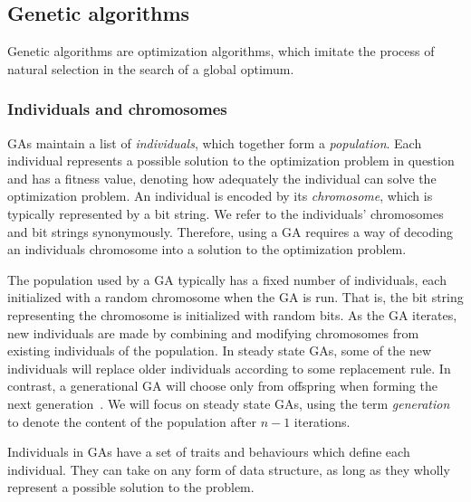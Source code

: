 \subsection{Genetic algorithms} 
Genetic algorithms are optimization algorithms, which imitate the process of natural selection in the search of a global optimum.

\subsubsection{Individuals and chromosomes}
GAs maintain a list of \emph{individuals}, which together form a \emph{population}. Each individual represents a possible solution to the optimization problem in question and has a fitness value, denoting how adequately the individual can solve the optimization problem. An individual is encoded by its \emph{chromosome}, which is typically represented by a bit string. We refer to the individuals' chromosomes and bit strings synonymously. Therefore, using a GA requires a way of decoding an individuals chromosome into a solution to the optimization problem.

The population used by a GA typically has a fixed number of individuals, each initialized with a random chromosome when the GA is run. That is, the bit string representing the chromosome is initialized with random bits. As the GA iterates, new individuals are made by combining and modifying chromosomes from existing individuals of the population. In steady state GAs, some of the new individuals will replace older individuals according to some replacement rule. In contrast, a generational GA will choose only from offspring when forming the next generation~\cite{fogarty, Syswerda:1989:UCG:645512.657265, Whitley:1989:GAS:93126.93169}. We will focus on steady state GAs, using the term \emph{generation}  to denote the content of the population after $n - 1$ iterations.

Individuals in GAs have a set of traits and behaviours which define each individual. They can take on any form of data structure, as long as they wholly represent a possible solution to the problem. 



